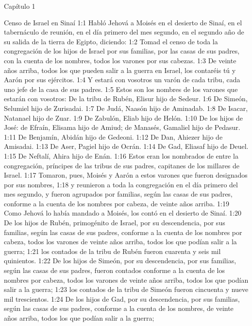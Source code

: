 Capítulo 1

Censo de Israel en Sinaí  
1:1 Habló Jehová a Moisés en el desierto de Sinaí, en el tabernáculo de reunión, en el día primero del mes segundo, en el segundo año de su salida de la tierra de Egipto, diciendo:  
1:2 Tomad el censo de toda la congregación de los hijos de Israel por sus familias, por las casas de sus padres, con la cuenta de los nombres, todos los varones por sus cabezas.  
1:3 De veinte años arriba, todos los que pueden salir a la guerra en Israel, los contaréis tú y Aarón por sus ejércitos.  
1:4 Y estará con vosotros un varón de cada tribu, cada uno jefe de la casa de sus padres.  
1:5 Estos son los nombres de los varones que estarán con vosotros: De la tribu de Rubén, Elisur hijo de Sedeur.  
1:6 De Simeón, Selumiel hijo de Zurisadai.  
1:7 De Judá, Naasón hijo de Aminadab.  
1:8 De Isacar, Natanael hijo de Zuar.  
1:9 De Zabulón, Eliab hijo de Helón.  
1:10 De los hijos de José: de Efraín, Elisama hijo de Amiud; de Manasés, Gamaliel hijo de Pedasur.  
1:11 De Benjamín, Abidán hijo de Gedeoni.  
1:12 De Dan, Ahiezer hijo de Amisadai.  
1:13 De Aser, Pagiel hijo de Ocrán.  
1:14 De Gad, Eliasaf hijo de Deuel. 
1:15 De Neftalí, Ahira hijo de Enán.  
1:16 Estos eran los nombrados de entre la congregación, príncipes de las tribus de sus padres, capitanes de los millares de Israel.  
1:17 Tomaron, pues, Moisés y Aarón a estos varones que fueron designados por sus nombres,  
1:18 y reunieron a toda la congregación en el día primero del mes segundo, y fueron agrupados por familias, según las casas de sus padres, conforme a la cuenta de los nombres por cabeza, de veinte años arriba.  
1:19 Como Jehová lo había mandado a Moisés, los contó en el desierto de Sinaí.  
1:20 De los hijos de Rubén, primogénito de Israel, por su descendencia, por sus familias, según las casas de sus padres, conforme a la cuenta de los nombres por cabeza, todos los varones de veinte años arriba, todos los que podían salir a la guerra;  
1:21 los contados de la tribu de Rubén fueron cuarenta y seis mil quinientos.  
1:22 De los hijos de Simeón, por su descendencia, por sus familias, según las casas de sus padres, fueron contados conforme a la cuenta de los nombres por cabeza, todos los varones de veinte años arriba, todos los que podían salir a la guerra;  
1:23 los contados de la tribu de Simeón fueron cincuenta y nueve mil trescientos.  
1:24 De los hijos de Gad, por su descendencia, por sus familias, según las casas de sus padres, conforme a la cuenta de los nombres, de veinte años arriba, todos los que podían salir a la guerra;  
